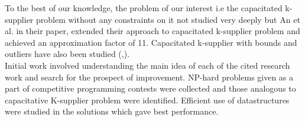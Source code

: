 \documentclass[12pt, a4paper]{article}
\begin{document}
To the best of our knowledge, the problem of our interest i.e the capacitated k-supplier problem without any constraints on it not studied very deeply but An et al.\cite{capKCcentrality} in their paper, extended their approach to capacitated k-supplier problem and achieved an approximation factor of 11. Capacitated k-supplier with bounds and outliers have also been studied (\cite{capKCoutliers},\cite{capKCbound}).\\

Initial work involved understanding the main idea of each of the cited research work and search for the prospect of improvement. NP-hard problems given as a part of competitive programming contests were collected and those analogous to capacitative K-supplier problem were identified. Efficient use of datastructures were studied in the solutions which gave best performance.\\
\end{document}

